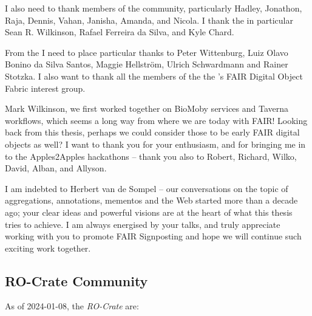 I also need to thank members of the  community, particularly Hadley, Jonathon, Raja, Dennis, Vahan, Janisha, Amanda, and Nicola. 
I thank the  in particular Sean R. Wilkinson, Rafael Ferreira da Silva, and Kyle Chard. 

From the  I need to place particular thanks to Peter Wittenburg, Luiz Olavo Bonino da Silva Santos, Maggie Hellström, Ulrich Schwardmann and Rainer Stotzka. I also want to thank all the members of the the 's FAIR Digital Object Fabric interest group.

Mark Wilkinson, we first worked together on BioMoby services and Taverna workflows, which seems a long way from where we are today with FAIR! Looking back from this thesis, perhaps we could consider those to be early FAIR digital objects as well? I want to thank you for your enthusiasm,  and for bringing me in to the Apples2Apples hackathons -- thank you also to Robert, Richard, Wilko, David, Alban, and Allyson.

I am indebted to Herbert van de Sompel -- our conversations on the topic of aggregations, annotations, mementos and the Web started more than a decade ago; your clear ideas and powerful visions are at the heart of what this thesis tries to achieve. I am always energised by your talks, and truly appreciate working with you to promote FAIR Signposting and hope we will continue such exciting work together.


\subsection{RO-Crate Community}\label{communitylist}
\label{ro-crate-community}

As of 2024-01-08, the \emph{RO-Crate}  are:

